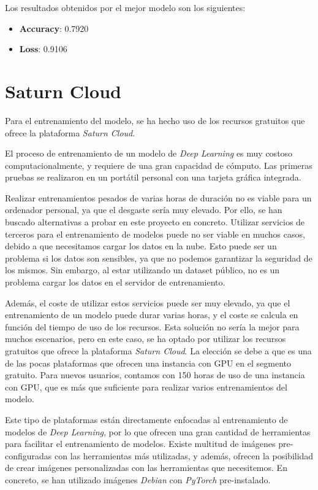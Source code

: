 Los resultados obtenidos por el mejor modelo son los siguientes:
\begin{itemize}
    \item \textbf{Accuracy}: 0.7920
    \item \textbf{Loss}: 0.9106
\end{itemize} 



\section{Saturn Cloud}\label{seccion:saturn-cloud}
Para el entrenamiento del modelo, se ha hecho uso de los recursos gratuitos que ofrece la plataforma \textit{Saturn Cloud}.

El proceso de entrenamiento de un modelo de \textit{Deep Learning} es muy costoso computacionalmente, y requiere de una gran capacidad de cómputo.
Las primeras pruebas se realizaron en un portátil personal con una tarjeta gráfica integrada.

Realizar entrenamientos pesados de varias horas de duración no es viable para un ordenador personal, ya que el desgaste sería muy elevado.
Por ello, se han buscado alternativas a probar en este proyecto en concreto.
Utilizar servicios de terceros para el entrenamiento de modelos puede no ser viable en muchos casos, debido a que necesitamos cargar los datos en la nube.
Esto puede ser un problema si los datos son sensibles, ya que no podemos garantizar la seguridad de los mismos.
Sin embargo, al estar utilizando un dataset público, no es un problema cargar los datos en el servidor de entrenamiento.

Además, el coste de utilizar estos servicios puede ser muy elevado, ya que el entrenamiento de un modelo puede durar varias horas, y el coste se calcula en función del tiempo de uso de los recursos.
Esta solución no sería la mejor para muchos escenarios, pero en este caso, se ha optado por utilizar los recursos gratuitos que ofrece la plataforma \textit{Saturn Cloud}.
La elección se debe a que es una de las pocas plataformas que ofrecen una instancia con GPU en el segmento gratuito.
Para nuevos usuarios, contamos con 150 horas de uso de una instancia con GPU, que es más que suficiente para realizar varios entrenamientos del modelo.

Este tipo de plataformas están directamente enfocadas al entrenamiento de modelos de \textit{Deep Learning}, por lo que ofrecen una gran cantidad de herramientas para facilitar el entrenamiento de modelos.
Existe multitud de imágenes pre-configuradas con las herramientas más utilizadas, y además, ofrecen la posibilidad de crear imágenes personalizadas con las herramientas que necesitemos.
En concreto, se han utilizado imágenes \textit{Debian} con \textit{PyTorch} pre-instalado.

